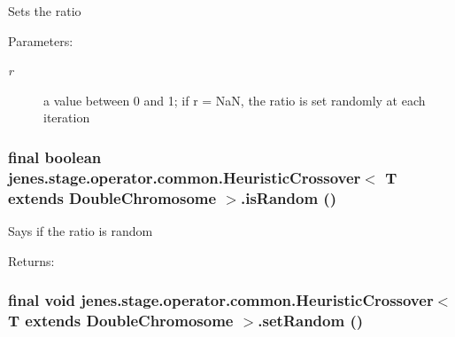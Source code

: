Sets the ratio \begin{Desc}
\item[Parameters:]
\begin{description}
\item[{\em r}]a value between 0 and 1; if r = NaN, the ratio is set randomly at each iteration \end{description}
\end{Desc}
\hypertarget{classjenes_1_1stage_1_1operator_1_1common_1_1_heuristic_crossover_3_01_t_01extends_01_double_chromosome_01_4_b965521456ce0233197659c9eb7f0e16}{
\subsubsection[isRandom]{\setlength{\rightskip}{0pt plus 5cm}final boolean jenes.stage.operator.common.HeuristicCrossover$<$ T extends {\bf DoubleChromosome} $>$.isRandom ()}}
\label{classjenes_1_1stage_1_1operator_1_1common_1_1_heuristic_crossover_3_01_t_01extends_01_double_chromosome_01_4_b965521456ce0233197659c9eb7f0e16}


Says if the ratio is random \begin{Desc}
\item[Returns:]\end{Desc}
\hypertarget{classjenes_1_1stage_1_1operator_1_1common_1_1_heuristic_crossover_3_01_t_01extends_01_double_chromosome_01_4_d3c86ba10d567679be7750185c955ef2}{
\subsubsection[setRandom]{\setlength{\rightskip}{0pt plus 5cm}final void jenes.stage.operator.common.HeuristicCrossover$<$ T extends {\bf DoubleChromosome} $>$.setRandom ()}}
\label{classjenes_1_1stage_1_1operator_1_1common_1_1_heuristic_crossover_3_01_t_01extends_01_double_chromosome_01_4_d3c86ba10d567679be7750185c955ef2}


